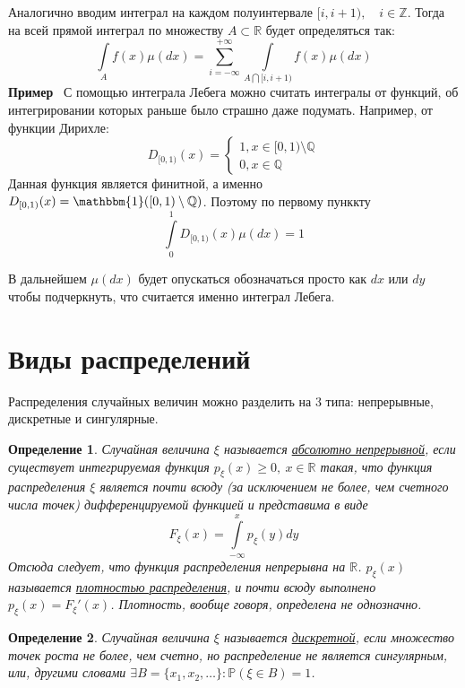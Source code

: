 \documentclass[12pt]{article}
\newtheorem{Def}{Определение}
\newenvironment{Ex}{{\bf Пример}\ }{}
\numberwithin{Th}{section}
\numberwithin{Def}{section}
\numberwithin{Lem}{section}
\numberwithin{St}{section}
\numberwithin{equation}{section}
\newcommand\Pro{\mathbb{P}} %
\newcommand\Real{\mathbb{R}} %
\newcommand\Ind{\mathbbm{1}} %
\begin{document}
	Аналогично вводим интеграл на каждом полуинтервале $[i, i+1), \quad i \in \mathbb{Z}$. Тогда на всей прямой интеграл по множеству $A \subset \Real$ будет определяться так:
	$$ \int\limits_A f(x) \mu(dx) = \sum\limits_{i=-\infty}^{+\infty} \int\limits_{A \bigcap [i, i+1)} f(x) \mu(dx) $$
\begin{Ex}
С помощью интеграла Лебега можно считать интегралы от функций, об интегрировании которых раньше было страшно даже подумать. Например, от функции Дирихле:
  \[
  	D_{[0,1)}(x) = 
  	\begin{cases}
  		1, x \in [0,1) \setminus \mathbb{Q} \\
  		0, x \in \mathbb{Q}
  	\end{cases}
  \]
  Данная функция является финитной, а именно $D_{[0,1)}(x) = \Ind([0,1) \setminus \mathbb{Q})$. Поэтому по первому пунккту
  $$ \int\limits_0^1 D_{[0,1)}(x) \mu(dx) = 1 $$
\end{Ex}

  В дальнейшем $\mu(dx)$ будет опускаться обозначаться просто как $dx$ или $dy$ чтобы подчеркнуть, что считается именно интеграл Лебега.
  
 \newpage
\section{Виды распределений}

Распределения случайных величин можно разделить на 3 типа: непрерывные, дискретные и сингулярные.

\begin{Def}
	Случайная величина $\xi$ называется \underline{абсолютно непрерывной}, если существует интегрируемая функция $p_\xi(x) \ge 0, \ x \in \Real$ такая, что
	функция распределения $\xi$ является почти всюду (за исключением не более, чем счетного числа точек) дифференцируемой функцией и представима в виде
	$$F_\xi(x) = \int\limits_{-\infty}^x p_\xi(y)dy$$
	Отсюда следует, что функция распределения непрерывна на $\Real$. $p_\xi(x)$ называется \underline{плотностью распределения},
	и почти всюду выполнено $p_\xi(x)=F_\xi'(x)$.
	Плотность, вообще говоря, определена не однозначно.
\end{Def}

\begin{Def}
	Случайная величина $\xi$ называется \underline{дискретной}, если множество точек роста не более, чем счетно, но распределение не является сингулярным, или, 
	другими словами $\exists B = \{x_1, x_2, \ldots\} \colon \Pro(\xi \in B) = 1$.
\end{Def}
\end{document}
